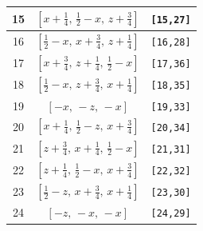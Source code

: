 \documentclass[fleqn,8pt]{jsarticle}
\begin{document}
\begin{longtable}{ccc}
15 & $\left[ x + \frac{1}{4},\, \frac{1}{2} - x,\, z + \frac{3}{4} \right]$ & {\tt [15,27]} \\ \hline
16 & $\left[ \frac{1}{2} - x,\, x + \frac{3}{4},\, z + \frac{1}{4} \right]$ & {\tt [16,28]} \\ \hline
17 & $\left[ x + \frac{3}{4},\, z + \frac{1}{4},\, \frac{1}{2} - x \right]$ & {\tt [17,36]} \\ \hline
18 & $\left[ \frac{1}{2} - x,\, z + \frac{3}{4},\, x + \frac{1}{4} \right]$ & {\tt [18,35]} \\ \hline
19 & $\left[ - x,\, - z,\, - x \right]$ & {\tt [19,33]} \\ \hline
20 & $\left[ x + \frac{1}{4},\, \frac{1}{2} - z,\, x + \frac{3}{4} \right]$ & {\tt [20,34]} \\ \hline
21 & $\left[ z + \frac{3}{4},\, x + \frac{1}{4},\, \frac{1}{2} - x \right]$ & {\tt [21,31]} \\ \hline
22 & $\left[ z + \frac{1}{4},\, \frac{1}{2} - x,\, x + \frac{3}{4} \right]$ & {\tt [22,32]} \\ \hline
23 & $\left[ \frac{1}{2} - z,\, x + \frac{3}{4},\, x + \frac{1}{4} \right]$ & {\tt [23,30]} \\ \hline
24 & $\left[ - z,\, - x,\, - x \right]$ & {\tt [24,29]} \\
\end{longtable}
\renewcommand{\arraystretch}{1.2}
\end{document}
